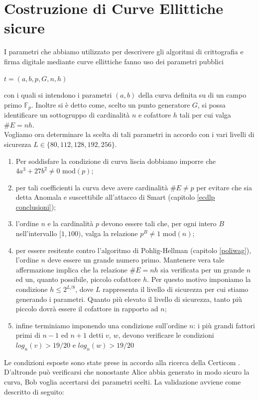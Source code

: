 \documentclass[a4paper,12pt]{tesiinfo}
\begin{document}
\section{Costruzione di Curve Ellittiche sicure}
I parametri che abbiamo utilizzato per descrivere gli algoritmi di crittografia e firma digitale mediante curve ellittiche fanno uso dei parametri pubblici
\begin{center}
$t=(a, b, p, G, n, h)$
\end{center}
con i quali si intendono i parametri $(a, b)$ della curva definita su di un campo primo $\mathbb{F}_p$. Inoltre si \`e detto come, scelto un punto generatore $G$, si possa identificare un sottogruppo di cardinalit\`a $n$ e cofattore $h$ tali per cui valga $\#E=nh$.
\\
Vogliamo ora determinare la scelta di tali parametri in accordo con i vari livelli di sicurezza $L \in \{80, 112, 128, 192, 256\}$.
\begin{enumerate}
 \item Per soddisfare la condizione di curva liscia dobbiamo imporre che $4a^3+27b^2 \ne 0$ mod$(p)$;
 \item per tali coefficienti la curva deve avere cardinalit\`a $\#E \ne p$ per evitare che sia detta Anomala e suscettibile all'attacco di Smart (capitolo \ref{ecdlp conclusioni});
 \item l'ordine $n$ e la cardinalit\`a $p$ devono essere tali che, per ogni intero $B$ nell'intervallo $[1, 100)$, valga la relazione $p^B \ne 1$ mod$(n)$;
 \item per essere resitente contro l'algoritmo di Pohlig-Hellman (capitolo \ref{poliwag}), l'ordine $n$ deve essere un grande numero primo. Mantenere vera tale affermazione implica che la relazione $\#E=nh$ sia verificata per un grande $n$ ed un, quanto possibile, piccolo cofattore $h$. Per questo motivo imponiamo la condizione $h \leq 2^{L / 8}$, dove $L$ rappresenta il livello di sicurezza per cui stiamo generando i parametri. Quanto pi\`u elevato il livello di sicurezza, tanto pi\`u piccolo dovr\`a essere il cofattore in rapporto ad $n$;
 \item infine terminiamo imponendo una condizione sull'ordine $n$: i pi\`u grandi fattori primi di $n-1$ ed $n+1$ detti $v$, $w$, devono verificare le condizioni $log_n (v) > 19/20$ e $ log_n (w) > 19/20$
\end{enumerate}
Le condizioni esposte sono state prese in accordo alla ricerca della Certicom \cite{sec1}. 
\\
D'altronde pu\`o verificarsi che nonostante Alice abbia generato in modo sicuro la curva, Bob voglia accertarsi dei parametri scelti. La validazione avviene come descritto di seguito:
\end{document}
